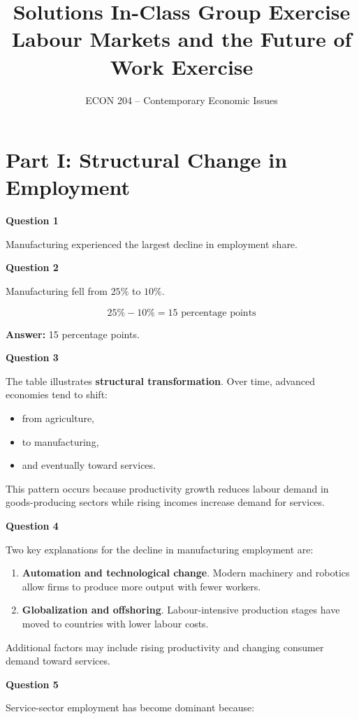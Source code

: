 \documentclass[12pt]{article}
\title{\textbf{Solutions  In-Class Group Exercise}\\
Labour Markets and the Future of Work Exercise}
\author{ECON 204 -- Contemporary Economic Issues}
\date{}
\begin{document}
\maketitle

\section*{Part I: Structural Change in Employment}

\textbf{Question 1}

Manufacturing experienced the largest decline in employment share.

\textbf{Question 2}

Manufacturing fell from $25\%$ to $10\%$.

\[
25\% - 10\% = 15 \text{ percentage points}
\]

\textbf{Answer:} 15 percentage points.

\textbf{Question 3}

The table illustrates \textbf{structural transformation}. Over time, advanced economies tend to shift:

\begin{itemize}
\item from agriculture,
\item to manufacturing,
\item and eventually toward services.
\end{itemize}

This pattern occurs because productivity growth reduces labour demand in goods-producing sectors while rising incomes increase demand for services.

\textbf{Question 4}

Two key explanations for the decline in manufacturing employment are:

\begin{enumerate}
\item \textbf{Automation and technological change}. Modern machinery and robotics allow firms to produce more output with fewer workers.
\item \textbf{Globalization and offshoring}. Labour-intensive production stages have moved to countries with lower labour costs.
\end{enumerate}

Additional factors may include rising productivity and changing consumer demand toward services.

\textbf{Question 5}

Service-sector employment has become dominant because:
\end{document}
